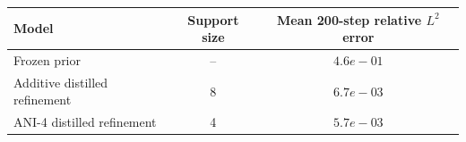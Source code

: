\begin{tabular}{lcc}
\toprule
\textbf{Model} & \textbf{Support size} & \textbf{Mean 200-step relative $L^2$ error} \\
\midrule
Frozen prior & -- & $4.6e-01$ \\
Additive distilled refinement & 8 & $6.7e-03$ \\
ANI-4 distilled refinement & 4 & $5.7e-03$ \\
\bottomrule
\end{tabular}
